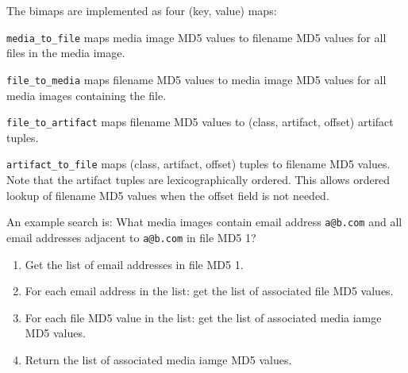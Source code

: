 \documentclass[12pt,twoside]{article}
\begin{document}
The bimaps are implemented as four (key, value) maps:
\begin{compactitem}
\item \verb+media_to_file+ maps media image MD5 values to filename MD5 values for all files in the media image.
\item \verb+file_to_media+ maps filename MD5 values to media image MD5 values for all media images containing the file.
\item \verb+file_to_artifact+ maps filename MD5 values to (class, artifact, offset) artifact tuples.
\item \verb+artifact_to_file+ maps (class, artifact, offset) tuples to filename MD5 values. Note that the artifact tuples are lexicographically ordered. This allows ordered lookup of filename MD5 values when the offset field is not needed.
\end{compactitem}

An example search is: What media images contain email address \verb+a@b.com+ and all email addresses adjacent to \verb+a@b.com+ in file MD5 1?

\begin{enumerate}
\item Get the list of email addresses in file MD5 1.
\item For each email address in the list: get the list of associated file MD5 values.
\item For each file MD5 value in the list: get the list of associated media iamge MD5 values.
\item Return the list of associated media iamge MD5 values.
\end{enumerate}
\end{document}
